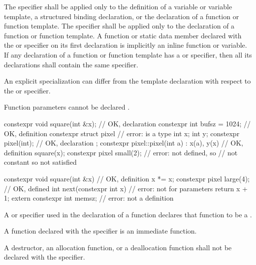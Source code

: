 \pnum
The  specifier shall be applied only to
the definition of a variable or variable template,
a structured binding declaration, or
the declaration of a function or function template.
The  specifier shall be applied only to
the declaration of a function or function template.
A function or static data member
declared with the  or  specifier
on its first declaration
is implicitly an inline function or variable.
If any declaration of a function or function template has
a  or  specifier,
then all its declarations shall contain the same specifier.
\begin{note}
An explicit specialization can differ from the template declaration
with respect to the  or  specifier.
\end{note}
\begin{note}
Function parameters cannot be declared .
\end{note}
\begin{example}
\begin{codeblock}
constexpr void square(int &x);  // OK, declaration
constexpr int bufsz = 1024;     // OK, definition
constexpr struct pixel {        // error:  is a type
  int x;
  int y;
  constexpr pixel(int);         // OK, declaration
};
constexpr pixel::pixel(int a)
  : x(a), y(x)                  // OK, definition
  { square(x); }
constexpr pixel small(2);       // error:  not defined, so 
                                // not constant so  not satisfied

constexpr void square(int &x) { // OK, definition
  x *= x;
}
constexpr pixel large(4);       // OK,  defined
int next(constexpr int x) {     // error: not for parameters
     return x + 1;
}
extern constexpr int memsz;     // error: not a definition
\end{codeblock}
\end{example}

\pnum
A  or  specifier
used in the declaration of a function
declares that function to be
a .
\begin{note}
A function declared with the  specifier
is an immediate function.
\end{note}
A destructor, an allocation function, or a deallocation function
shall not be declared with the  specifier.

